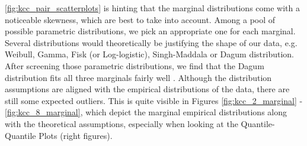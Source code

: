 
\autoref{fig:kcc_pair_scatterplots} is hinting that the marginal distributions come with a noticeable skewness, which are best to take into account. Among a pool of possible parametric distributions, we pick an appropriate one for each marginal. Several distributions would theoretically be justifying the shape of our data, e.g. Weibull, Gamma, Fisk (or Log-logistic), Singh-Maddala or Dagum distribution. After screening those parametric distributions, we find that the Dagum distribution fits all three marginals fairly well \citep{dagum1975model}. Although the distribution assumptions are aligned with the empirical distributions of the data, there are still some expected outliers. This is quite visible in Figures \ref{fig:kcc_2_marginal} - \ref{fig:kcc_8_marginal}, which depict the marginal empirical distributions along with the theoretical assumptions, especially when looking at the Quantile-Quantile Plots (right figures).



